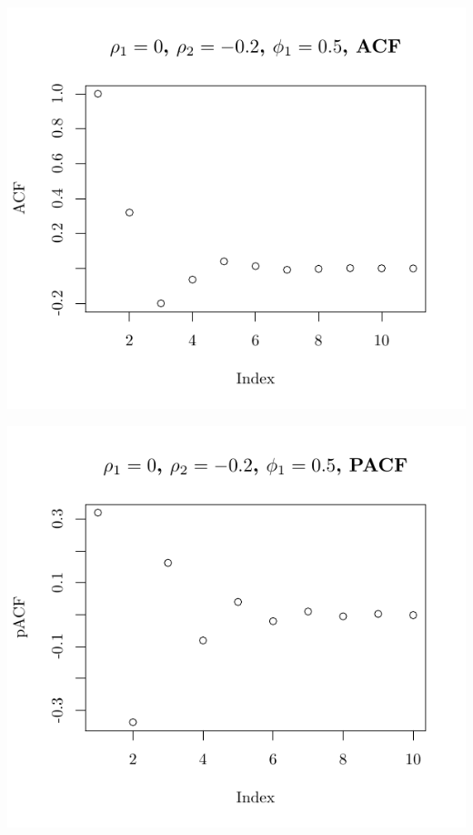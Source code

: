 \documentclass[10pt]{paper}\usepackage[]{graphicx}\usepackage[]{color}
\makeatletter
\def\maxwidth{ %
  \ifdim\Gin@nat@width>\linewidth
    \linewidth
  \else
    \Gin@nat@width
  \fi
}
\newenvironment{knitrout}{}{} %
\makeatother
\begin{document}
\begin{knitrout}
{\centering \includegraphics[width=\maxwidth]{figure/graphics-plotter-55} 

}




{\centering \includegraphics[width=\maxwidth]{figure/graphics-plotter-56} 

}





\end{knitrout}
\end{document}
